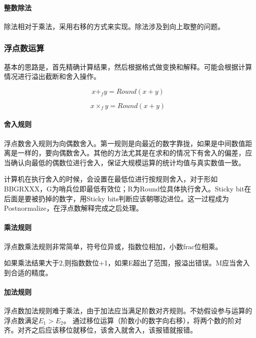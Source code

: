 \paragraph{整数除法}

除法相对于乘法，采用右移的方式来实现。除法涉及到向上取整的问题。

\subsubsection{浮点数运算}
基本的思路是，首先精确计算结果，然后根据格式做变换和解释。可能会根据计算情况进行溢出截断和舍入操作。

\[
x +_f y = Round(x + y)
\]

\[
x \times_f y = Round(x + y)
\]

\paragraph{舍入规则}浮点数舍入规则为向偶数舍入。第一规则是向最近的数字靠拢，如果是中间数值距离是一样的，要向偶数舍入。其他的方法尤其是在求和的情况下有舍入的偏差，应当确认向最低的偶数位进行舍入，保证大规模运算的统计均值与真实数值一致。

计算机在执行舍入的时候，会设置在最低位进行按规则舍入，对于形如BBGRXXX，G为哨兵位即最低有效位；R为Round位具体执行舍入。Sticky bit在后面是要被扔掉的数字，用Sticky bits判断应该朝哪边进位。这一过程成为Postnormalize，在浮点数解释完成之后处理。

\paragraph{乘法规则}

浮点数乘法规则非常简单，符号位异或，指数位相加，小数frac位相乘。

如果乘法结果大于2,则指数数位+1，如果E超出了范围，报溢出错误。M应当舍入到合适的精度。

\paragraph{加法规则}

浮点数加法规则难于乘法，由于加法应当满足阶数对齐规则。不妨假设参与运算的浮点数满足$E_1 > E_2$。
通过移位运算（阶数小的数字向右移），将两个数的阶对齐。对齐之后应该移位就移位，该舍入就舍入，该报错就报错。

